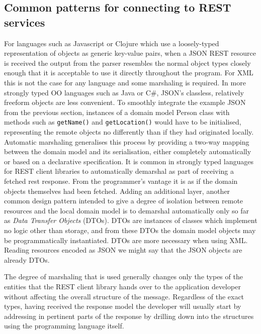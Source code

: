 \documentclass[12pt, ]{article}
\begin{document}
\subsection{Common patterns for connecting to REST
services}\label{common-patterns-for-connecting-to-rest-services}

For languages such as Javascript or Clojure which use a loosely-typed
representation of objects as generic key-value pairs, when a JSON REST
resource is received the output from the parser resembles the normal
object types closely enough that it is acceptable to use it directly
throughout the program. For XML this is not the case for any language
and some marshaling is required. In more strongly typed OO languages
such as Java or C\#, JSON's classless, relatively freeform objects are
less convenient. To smoothly integrate the example JSON from the
previous section, instances of a domain model Person class with methods
such as \texttt{getName()} and \texttt{getLocation()} would have to be
initialised, representing the remote objects no differently than if they
had originated locally. Automatic marshaling generalises this process by
providing a two-way mapping between the domain model and its
serialisation, either completely automatically or based on a declarative
specification. It is common in strongly typed languages for REST client
libraries to automatically demarshal as part of receiving a fetched rest
response. From the programmer's vantage it is as if the domain objects
themselves had been fetched. Adding an additional layer, another common
design pattern intended to give a degree of isolation between remote
resources and the local domain model is to demarshal automatically only
so far as \emph{Data Transfer Objects} (DTOs). DTOs are instances of
classes which implement no logic other than storage, and from these DTOs
the domain model objects may be programmatically instantiated. DTOs are
more necessary when using XML. Reading resources encoded as JSON we
might say that the JSON objects are already DTOs.

The degree of marshaling that is used generally changes only the types
of the entities that the REST client library hands over to the
application developer without affecting the overall structure of the
message. Regardless of the exact types, having received the response
model the developer will usually start by addressing in pertinent parts
of the response by drilling down into the structures using the
programming language itself.
\end{document}
